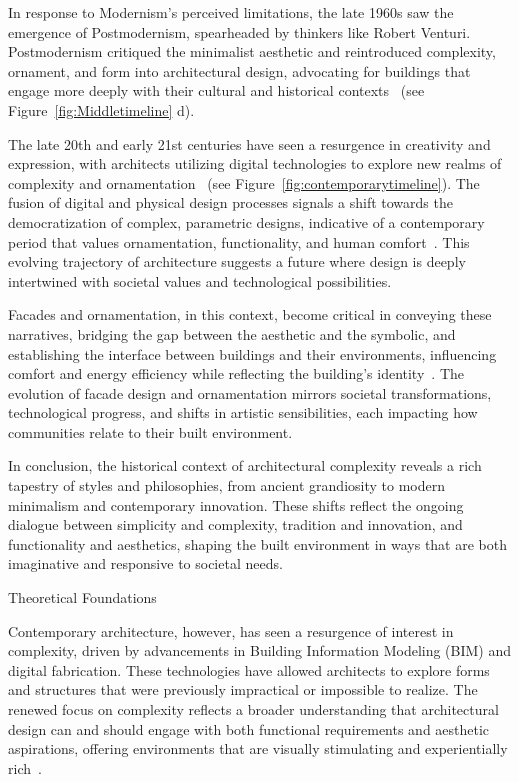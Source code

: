 In response to Modernism's perceived limitations, the late 1960s saw the emergence of Postmodernism, spearheaded by thinkers like Robert Venturi.
Postmodernism critiqued the minimalist aesthetic and reintroduced complexity, ornament, and form into architectural design, advocating for buildings that engage more deeply with their cultural and historical contexts~\cite{Venturi1972} (see Figure~\ref{fig:Middletimeline} d).

The late 20th and early 21st centuries have seen a resurgence in creativity and expression, with architects utilizing digital technologies to explore new realms of complexity and ornamentation~\cite{Burlando2019} (see Figure~\ref{fig:contemporarytimeline}).
The fusion of digital and physical design processes signals a shift towards the democratization of complex, parametric designs, indicative of a contemporary period that values ornamentation, functionality, and human comfort~\cite{Schwab2016}.
This evolving trajectory of architecture suggests a future where design is deeply intertwined with societal values and technological possibilities.

Facades and ornamentation, in this context, become critical in conveying these narratives, bridging the gap between the aesthetic and the symbolic, and establishing the interface between buildings and their environments, influencing comfort and energy efficiency while reflecting the building's identity~\cite{Kamal2020}.
The evolution of facade design and ornamentation mirrors societal transformations, technological progress, and shifts in artistic sensibilities, each impacting how communities relate to their built environment.

In conclusion, the historical context of architectural complexity reveals a rich tapestry of styles and philosophies, from ancient grandiosity to modern minimalism and contemporary innovation.
These shifts reflect the ongoing dialogue between simplicity and complexity, tradition and innovation, and functionality and aesthetics, shaping the built environment in ways that are both imaginative and responsive to societal needs.

Theoretical Foundations

Contemporary architecture, however, has seen a resurgence of interest in complexity, driven by advancements in Building Information Modeling (BIM) and digital fabrication. These technologies have allowed architects to explore forms and structures that were previously impractical or impossible to realize. The renewed focus on complexity reflects a broader understanding that architectural design can and should engage with both functional requirements and aesthetic aspirations, offering environments that are visually stimulating and experientially rich~\cite{Gage2015}.

